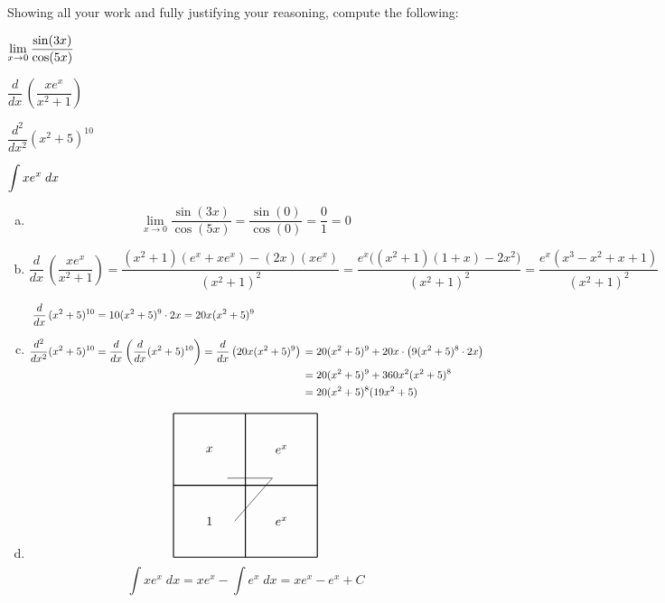\documentclass[11pt,letterpaper]{article}
\begin{document}

 Showing all your work and fully justifying your reasoning, compute the following:
	\begin{2enumerate}
	\item $\displaystyle \lim_{x \to 0} \dfrac{\sin(3x)}{\cos(5x)}$
	\item $\dfrac{d}{dx}\, \left( \dfrac{x e^x}{x^2 + 1} \right)$
	\item $\dfrac{d^2}{dx^2} (x^2 + 5)^{10}$
	\item $\displaystyle \int x e^x \; dx$
	\end{2enumerate} \pspace

\sol 
\begin{enumerate}[(a)]
\item 
	\[
	\lim_{x \to 0} \dfrac{\sin(3x)}{\cos(5x)}= \dfrac{\sin(0)}{\cos(0)}= \dfrac{0}{1}= 0
	\]

\item 
	\[
	\dfrac{d}{dx}\, \left( \dfrac{x e^x}{x^2 + 1} \right)= \dfrac{(x^2 + 1)(e^x + xe^x) - (2x)(xe^x)}{(x^2 + 1)^2}= \dfrac{e^x \big((x^2 + 1)(1 + x) - 2x^2 \big)}{(x^2 + 1)^2}= \dfrac{e^x (x^3 - x^2 + x + 1)}{(x^2 + 1)^2}
	\]

\item 
	\[
	\begin{aligned}
	\dfrac{d}{dx}\, (x^2 + 5)^{10}&= 10(x^2 + 5)^9 \cdot 2x= 20x (x^2 + 5)^9 && \\[0.3cm]
	\dfrac{d^2}{dx^2} (x^2 + 5)^{10}&= \dfrac{d}{dx} \left( \dfrac{d}{dx} (x^2 + 5)^{10} \right)= \dfrac{d}{dx} \left( 20x (x^2 + 5)^9 \right) \hspace{-0.3cm} &&= 20(x^2 + 5)^9 + 20x \cdot \big( 9(x^2 + 5)^8 \cdot 2x \big) \\
	&&&= 20(x^2 + 5)^9 + 360x^2 (x^2 + 5)^8 \\
	&&&= 20(x^2 + 5)^8 (19x^2 + 5)
	\end{aligned}
	\]

\item 
	\[
	\begin{tikzpicture}
	\draw[thick] (0,0) -- (4,0);
	\draw[thick] (4,0) -- (4,4);
	\draw[thick] (4,4) -- (0,4);
	\draw[thick] (0,4) -- (0,0);
	\draw[thick] (2,0) -- (2,4);
	\draw[thick] (0,2) -- (4,2);
	\node at (1,3) {$x$};
	\node at (1,1) {$1$};
	\node at (3,1) {$e^x$};
	\node at (3,3) {$e^x$};
	\draw (1.5,2.2) -- (2.75,2.2) -- (1.7,1);
	\end{tikzpicture}
	\]
	\[
	\int xe^x \;dx= xe^x - \int e^x \;dx= xe^x - e^x + C
	\]
\end{enumerate}
\end{document}
